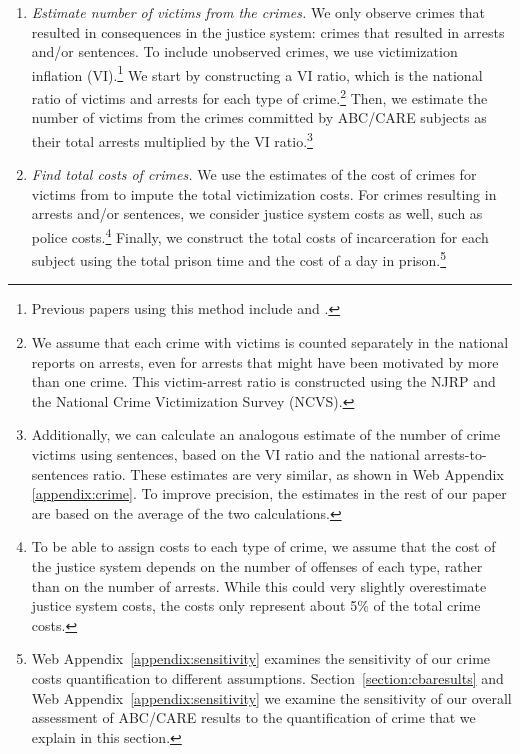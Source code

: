 \begin{enumerate}
\item \textit{Estimate number of victims from the crimes.} We only observe crimes that resulted in consequences in the justice system: crimes that resulted in arrests and/or sentences. To include unobserved crimes, we use victimization inflation (VI).\footnote{Previous papers using this method include \citet{Belfield_Nores_etal_2006_JHR} and \cite{Heckman_Moon_etal_2010_RateofReturn}.} We start by constructing a VI ratio, which is the national ratio of victims and arrests for each type of crime.\footnote{We assume that each crime with victims is counted separately in the national reports on arrests, even for arrests that might have been motivated by more than one crime. This victim-arrest ratio is constructed using the NJRP and the National Crime Victimization Survey (NCVS).} Then, we estimate the number of victims from the crimes committed by ABC/CARE subjects as their total arrests multiplied by the VI ratio.\footnote{Additionally, we can calculate an analogous estimate of the number of crime victims using sentences, based on the VI ratio and the national arrests-to-sentences ratio. These estimates are very similar, as shown in Web Appendix \ref{appendix:crime}. To improve precision, the estimates in the rest of our paper are based on the average of the two calculations.}

\item \textit{Find total costs of crimes.} We use the estimates of the cost of crimes for victims from \cite{McCollister_etal_2010_DAD} to impute the total victimization costs. For crimes resulting in arrests and/or sentences, we consider justice system costs as well, such as police costs.\footnote{To be able to assign costs to each type of crime, we assume that the cost of the justice system depends on the number of offenses of each type, rather than on the number of arrests. While this could very slightly overestimate justice system costs, the costs only represent about 5\% of the total crime costs.} Finally, we construct the total costs of incarceration for each subject using the total prison time and the cost of a day in prison.\footnote{Web Appendix~\ref{appendix:sensitivity} examines the sensitivity of our crime costs quantification to different assumptions. Section~\ref{section:cbaresults} and Web Appendix~\ref{appendix:sensitivity} we examine the sensitivity of our overall assessment of ABC/CARE results to the quantification of crime that we explain in this section.}
\end{enumerate}

